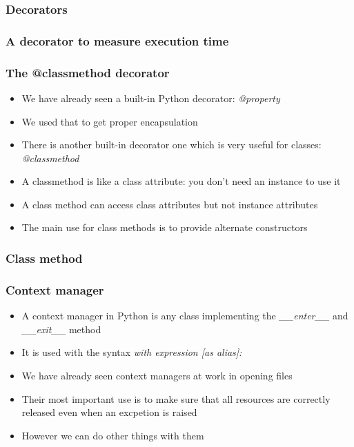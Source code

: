 \documentclass[9pt]{beamer}
\begin{document}
\begin{frame}
  \frametitle{Decorators}
  
\end{frame}


\begin{frame}
  \frametitle{A decorator to measure execution time}
  
\end{frame}


\begin{frame}
  \frametitle{The @classmethod decorator}
  \begin{itemize}
    \item We have already seen a built-in Python decorator: \emph{@property}
    \item We used that to get proper encapsulation
    \item There is another built-in decorator one which is very useful for classes: \alert{\emph{@classmethod}}
    \item A classmethod is like a class attribute: you don't need an instance to
          use it
    \item A class method can access class attributes but not instance attributes
    \item The main use for class methods is to provide \alert{alternate constructors}
  \end{itemize}
  
\end{frame}


\begin{frame}
  \frametitle{Class method}
  
\end{frame}


\begin{frame}
  \frametitle{Context manager}
  \begin{itemize}
    \item A \alert{context manager} in Python is any class implementing the \emph{\_\_enter\_\_} and
          \emph{\_\_exit\_\_} method
    \item It is used with the syntax \emph{with expression [as alias]:}
    \item We have already seen context managers at work in opening files
    \item Their most important use is to make sure that all resources are correctly released
          \alert{even when an excpetion is raised}
    \item However we can do other things with them
  \end{itemize}
\end{frame}
\end{document}
